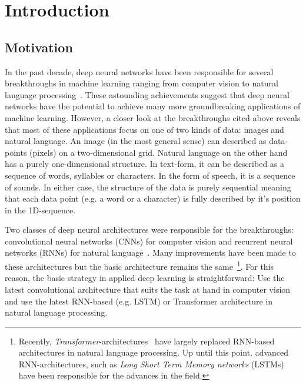 \chapter{Introduction}
\label{chapter:Introduction}




\section{Motivation}
\label{sec:motivation}

In the past decade, deep neural networks have been responsible for several breakthroughs in machine learning ranging from computer vision to natural language processing~\cite{Goodfellow-et-al-2016}. These astounding achievements suggest that deep neural networks have the potential to achieve many more groundbreaking applications of machine learning. However, a closer look at the breakthroughs cited above reveals that most of these applications focus on one of two kinds of data: images and natural language. An image (in the most general sense) can described as data-points (pixels) on a two-dimensional grid. Natural language on the other hand has a purely one-dimensional structure. In text-form, it can be described as a sequence of words, syllables or characters. In the form of speech, it is a sequence of sounds. In either case, the structure of the data is purely sequential meaning that each data point (e.g. a word or a character) is fully described by it's position in the 1D-sequence.

Two classes of deep neural architectures were responsible for the breakthroughs: convolutional neural networks (CNNs) for computer vision and recurrent neural networks (RNNs) for natural language~\cite{Goodfellow-et-al-2016}. Many improvements have been made to these architectures but the basic architecture remains the same~\footnote{Recently, \textit{Transformer}-architectures~\cite{Vaswani2017} have largely replaced RNN-based architectures in natural language processing. Up until this point, advanced RNN-architectures, such as \textit{Long Short Term Memory networks} (LSTMs)~\cite{Hochreiter1997} have been responsible for the advances in the field.}. For this reason, the basic strategy in applied deep learning is straightforward: Use the latest convolutional architecture that suits the task at hand in computer vision and use the latest RNN-based (e.g. LSTM) or Transformer architecture in natural language processing.

